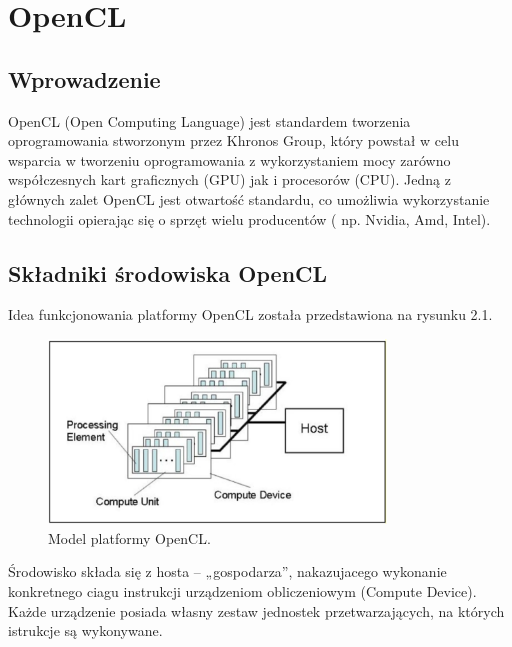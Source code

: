 \chapter{OpenCL}

\section{Wprowadzenie}
OpenCL (Open Computing Language) jest standardem tworzenia oprogramowania stworzonym przez Khronos Group, który powstał w celu wsparcia w tworzeniu oprogramowania z wykorzystaniem mocy zarówno współczesnych kart graficznych (GPU) jak i procesorów (CPU). Jedną z głównych zalet OpenCL jest otwartość standardu, co umożliwia wykorzystanie technologii opierając się o sprzęt wielu producentów ( np. Nvidia, Amd, Intel).

\section{Składniki środowiska OpenCL}
Idea funkcjonowania platformy OpenCL została przedstawiona na rysunku 2.1. \\
\begin{figure}[h]
\centering
\includegraphics[width=0.8\textwidth]{figures/opencl_platform_model.png}
\caption{Model platformy OpenCL.}%
\label{rys:OpenCL Platform Model}
\end{figure}
Środowisko składa się z hosta – „gospodarza”, nakazujacego wykonanie konkretnego ciagu instrukcji urządzeniom obliczeniowym (Compute Device). Każde urządzenie posiada własny zestaw jednostek przetwarzających, na których istrukcje są wykonywane.

